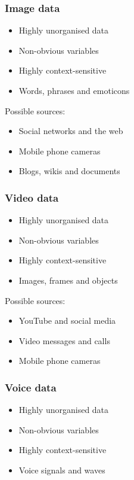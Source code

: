 \documentclass[11pt]{article}
\begin{document}
\subsubsection{Image data}
\label{sec:orgc49490f}
\begin{itemize}
\item Highly unorganised data
\item Non-obvious variables
\item Highly context-sensitive
\item Words, phrases and emoticons
\end{itemize}

Possible sources:
\begin{itemize}
\item Social networks and the web
\item Mobile phone cameras
\item Blogs, wikis and documents
\end{itemize}
\subsubsection{Video data}
\label{sec:org2b0e05f}
\begin{itemize}
\item Highly unorganised data
\item Non-obvious variables
\item Highly context-sensitive
\item Images, frames and objects
\end{itemize}

Possible sources:
\begin{itemize}
\item YouTube and social media
\item Video messages and calls
\item Mobile phone cameras
\end{itemize}

 \newpage
\subsubsection{Voice data}
\label{sec:org0c61a91}
\begin{itemize}
\item Highly unorganised data
\item Non-obvious variables
\item Highly context-sensitive
\item Voice signals and waves
\end{itemize}
\end{document}
